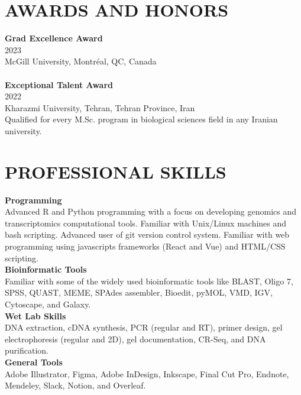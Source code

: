 \documentclass[a4paper,9pt]{extarticle}
\begin{document}

\section*{AWARDS AND HONORS}

\noindent
\newline
\textbf{Grad Excellence Award} \\
2023 \\
McGill University, Montréal, QC, Canada \\
\\
\noindent
\textbf{ Exceptional Talent Award} \\
2022 \\
Kharazmi University, Tehran, Tehran Province, Iran \\
Qualified for every M.Sc. program in biological sciences field in any Iranian university.  \\



\section*{PROFESSIONAL SKILLS}

\noindent
\newline
\textbf{Programming} \\
Advanced R and Python programming with a focus on developing genomics and transcriptomics computational tools. Familiar with Unix/Linux machines and bash scripting. Advanced user of git version control system. Familiar with web programming using javascripts frameworks (React and Vue) and HTML/CSS scripting.\\

\noindent
\textbf{Bioinformatic Tools} \\
Familiar with some of the widely used bioinformatic tools like BLAST, Oligo 7, SPSS, QUAST, MEME, SPAdes assembler, Bioedit, pyMOL, VMD, IGV, Cytoscape, and Galaxy.  \\

\noindent
\textbf{Wet Lab Skills} \\
DNA extraction, cDNA synthesis, PCR (regular and RT), primer design, gel electrophoresis (regular and 2D), gel documentation, CR-Seq, and DNA purification. \\

\noindent
\textbf{General Tools} \\
Adobe Illustrator, Figma, Adobe InDesign, Inkscape, Final Cut Pro, Endnote, Mendeley, Slack, Notion, and Overleaf.
\end{document}
